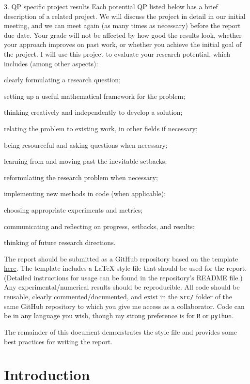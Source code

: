 \documentclass[12pt]{article}
\begin{document}
\item[3. QP specific project results] Each potential QP listed below has a brief
description of a related project. We will discuss the project in detail in our
initial meeting, and we can meet again (as many times as necessary) before the
report due date. Your grade will not be affected by how good the results look,
whether your approach improves on past work, or whether you achieve the initial
goal of the project. I will use this project to evaluate your research 
potential, which includes (among other aspects):
  \bitem
  \item clearly formulating a research question;
  \item setting up a useful mathematical framework for the problem;
  \item thinking creatively and independently to develop a solution;
  \item relating the problem to existing work, in other fields if necessary;
  \item being resourceful and asking questions when necessary;
  \item learning from and moving past the inevitable setbacks;
  \item reformulating the research problem when necessary;
  \item implementing new methods in code (when applicable);
  \item choosing appropriate experiments and metrics;
  \item communicating and reflecting on progress, setbacks, and results;
  \item thinking of future research directions.
  \eitem
\edesc


The report should be submitted as a GitHub repository based on the template
\href{https://github.com/dajmcdon/qp-template}{here}. The template includes a LaTeX
style file that should be used for the report. (Detailed instructions for usage
can be found in the repository's README file.) Any experimental/numerical
results should be reproducible. All code should be reusable, clearly
commented/documented, and exist in the \texttt{src/} folder of the same GitHub
repository to which you give me access as a collaborator. Code can be in any
language you wish, though my strong preference is for \texttt{R} or
\texttt{python}.


The remainder of this document demonstrates the style file and provides some
best practices for writing the report. 

\section{Introduction}\label{sec:intro}
\end{document}
